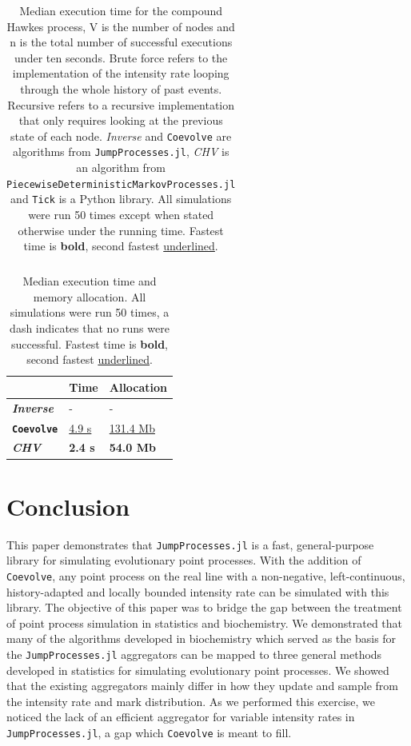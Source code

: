 \documentclass{juliacon}
\numberwithin{equation}{section}
\begin{document}
\begin{table}
\begin{tabular}{clllllll}
\bottomrule
\end{tabular}
\caption{Median execution time for the compound Hawkes process, V is the number of nodes and n is the total number of successful executions under ten seconds. Brute force refers to the implementation of the intensity rate looping through the whole history of past events. Recursive refers to a recursive implementation that only requires looking at the previous state of each node. \textit{Inverse} and \texttt{Coevolve} are algorithms from \texttt{JumpProcesses.jl}, \textit{CHV} is an algorithm from \texttt{PiecewiseDeterministicMarkovProcesses.jl} and \texttt{Tick} is a Python library. All simulations were run 50 times except when stated otherwise under the running time. Fastest time is \textbf{bold}, second fastest \underline{underlined}.}
\label{tab:benchmark-hawkes}
\end{table}

\begin{table}
\centering
\begin{tabular}{lll}
\toprule
 & \textbf{Time} & \textbf{Allocation}  \\
\hline
\textbf{\textit{Inverse}} & -  & - \\
\textbf{\texttt{Coevolve}} & \underline{4.9 s} & \underline{131.4 Mb}  \\
\textbf{\textit{CHV}} & \textbf{2.4 s} & \textbf{54.0 Mb} \\
\bottomrule
\end{tabular}
\caption{Median execution time and memory allocation. All simulations were run 50 times, a dash indicates that no runs were successful. Fastest time is \textbf{bold}, second fastest \underline{underlined}.}
\label{tab:benchmark-synapse}
\end{table}

\section{Conclusion}

This paper demonstrates that \texttt{JumpProcesses.jl} is a fast, general-purpose library for simulating evolutionary point processes. With the addition of \texttt{Coevolve}, any point process on the real line with a non-negative, left-continuous, history-adapted and locally bounded intensity rate can be simulated with this library. The objective of this paper was to bridge the gap between the treatment of point process simulation in statistics and biochemistry. We demonstrated that many of the algorithms developed in biochemistry which served as the basis for the \texttt{JumpProcesses.jl} aggregators can be mapped to three general methods developed in statistics for simulating evolutionary point processes. We showed that the existing aggregators mainly differ in how they update and sample from the intensity rate and mark distribution. As we performed this exercise, we noticed the lack of an efficient aggregator for variable intensity rates in \texttt{JumpProcesses.jl}, a gap which \texttt{Coevolve} is meant to fill.
\end{document}

